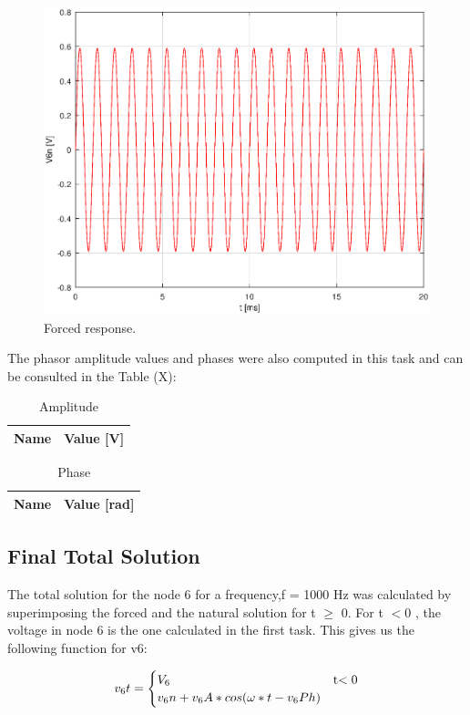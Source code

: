 \begin{figure}[H] \centering
\includegraphics[width=0.6\linewidth]{Forced4.eps}
\caption{Forced response.}
\label{fig:point4}
\end{figure}

The phasor amplitude values and phases were also computed in this task and can be consulted in the Table (X):
\begin{table}[H]
  \centering
  \begin{tabular}{|l|r|}
    \hline    
    {\bf Name} & {\bf Value [V]} \\ \hline
    
  \end{tabular}
  \caption{Amplitude}
  \label{tab:amp}
\end{table}

\begin{table}[H]
  \centering
  \begin{tabular}{|l|r|}
    \hline    
    {\bf Name} & {\bf Value [rad]} \\ \hline
    
  \end{tabular}
  \caption{Phase}
  \label{tab:phases}
\end{table}

\subsection{Final Total Solution}
The total solution for the node 6 for a frequency,f = 1000 Hz was calculated by superimposing
the forced and the natural solution for t $\ge$ 0. For t $<$0 , the voltage in node 6 is the
one calculated in the first task. This gives us the following function for v6:

\begin{equation}
v_6t=
\begin{cases}
V_6 & $t$ <0 \\
v_6n + v_6A * cos(\omega *t - v_6Ph)
\end{cases}
\label {eq:v6t}
\end{equation}


